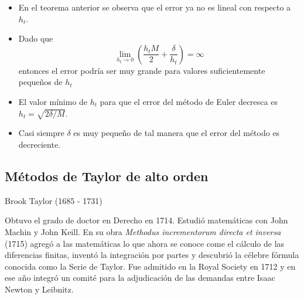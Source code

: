 \documentclass{beamer}
\begin{document}
\begin{frame}

\begin{itemize}
	\item En el teorema anterior se observa que el error ya no es lineal con respecto a $h_t$.
	\item Dado que 
	\begin{displaymath}
	\lim\limits_{h_t \to 0} \left( \dfrac{h_t M}{2} + \dfrac{\delta}{h_t} \right) = \infty
	\end{displaymath}
	entonces el error podría ser muy grande para valores suficientemente pequeños de $h_t$
	\item El valor mínimo de $h_t$ para que el error del método de Euler decresca es $h_t = \sqrt{2\delta / M}$.
	\item Casi siempre $\delta$ es muy pequeño de tal manera que el error del método es decreciente.
\end{itemize}

\end{frame}

\subsection{Métodos de Taylor de alto orden}

\begin{frame}{Brook Taylor (1685 - 1731)}

	 Obtuvo el grado de doctor en Derecho en 1714. Estudió matemáticas con John Machin y John Keill. \pause En su obra \textit{ Methodus incrementorum directa et inversa} (1715) agregó a las matemáticas lo que ahora se conoce come el cálculo de las diferencias finitas, inventó la integración por partes y descubrió la célebre fórmula conocida como la Serie de Taylor. \pause Fue admitido en la Royal Society en 1712 y en ese año integró un comité para la adjudicación de las demandas entre Isaac Newton y Leibnitz. 
\end{frame}
\end{document}
